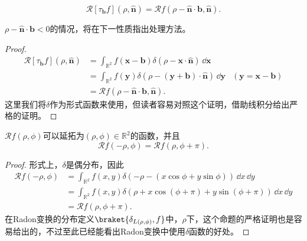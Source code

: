 \begin{proposition}[平移性质]
    \begin{equation}
        \mathcal{R}[\tau_{\mathbf{b}}f](\rho,\hat{\mathbf{n}})=\mathcal{R}f(\rho-\hat{\mathbf{n}}\cdot\mathbf{b},\hat{\mathbf{n}}).
    \end{equation}
\end{proposition}
$\rho-\hat{\mathbf{n}}\cdot\mathbf{b}<0$的情况，将在下一性质指出处理方法。
\begin{proof}
    \begin{align}
        \mathcal{R}[\tau_{\mathbf{b}}f](\rho,\hat{\mathbf{n}})&=\int_{\mathbb{R}^2}f(\mathbf{x}-\mathbf{b})\delta(\rho-\mathbf{x}\cdot\hat{\mathbf{n}})\,\dd\mathbf{x}\nonumber\\
        &=\int_{\mathbb{R}^2}f(\mathbf{y})\delta(\rho-(\mathbf{y}+\mathbf{b})\cdot\hat{\mathbf{n}})\,\dd\mathbf{y}&(\mathbf{y}=\mathbf{x}-\mathbf{b})\nonumber\\
        &=\mathcal{R}f(\rho-\hat{\mathbf{n}}\cdot\mathbf{b},\hat{\mathbf{n}}).
    \end{align}
    这里我们将$\delta$作为形式函数来使用，但读者容易对照这个证明，借助线积分给出严格的证明。
\end{proof}

\begin{proposition}[均匀性]
    $\mathcal{R}f(\rho,\phi)$可以延拓为$(\rho,\phi)\in\mathbb{R}^2$的函数，并且
    \begin{equation}
        \mathcal{R}f(-\rho,\phi)=\mathcal{R}f(\rho,\phi+\pi).
    \end{equation}
\end{proposition}
\begin{proof}
    形式上，$\delta$是偶分布，因此
    \begin{align}
        \mathcal{R}f(-\rho,\phi)&=\int_{\mathbb{R}^2}f(x,y)\delta(-\rho-(x\cos\phi+y\sin\phi))\,\dd x\,\dd y\nonumber\\
        &=\int_{\mathbb{R}^2}f(x,y)\delta(\rho+x\cos(\phi+\pi)+y\sin(\phi+\pi))\,\dd x\,\dd y\nonumber\\
        &=\mathcal{R}f(\rho,\phi+\pi).
    \end{align}
    在Radon变换的分布定义$\braket{\delta_{L(\rho,\phi)},f}$中，$\rho$下，这个命题的严格证明也是容易给出的，不过至此已经能看出Radon变换中使用$\delta$函数的好处。
\end{proof}


